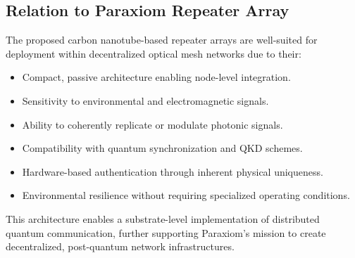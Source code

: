 \documentclass[11pt]{article}
\begin{document}
	\subsection*{Relation to Paraxiom Repeater Array}
	The proposed carbon nanotube-based repeater arrays are well-suited for deployment within decentralized optical mesh networks due to their:
	\begin{itemize}
		\item Compact, passive architecture enabling node-level integration.
		\item Sensitivity to environmental and electromagnetic signals.
		\item Ability to coherently replicate or modulate photonic signals.
		\item Compatibility with quantum synchronization and QKD schemes.
		\item Hardware-based authentication through inherent physical uniqueness.
		\item Environmental resilience without requiring specialized operating conditions.
	\end{itemize}
	
	This architecture enables a substrate-level implementation of distributed quantum communication, further supporting Paraxiom's mission to create decentralized, post-quantum network infrastructures.
	
\end{document}
